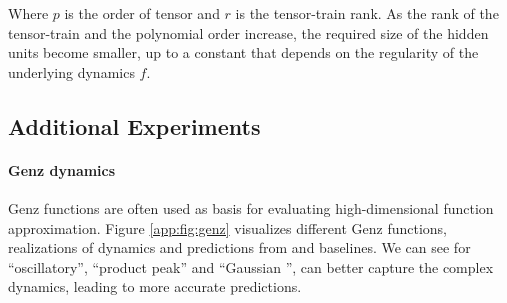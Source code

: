 Where $p$ is the order of tensor and $r$ is the tensor-train rank. As the rank of the tensor-train and the polynomial order increase, the required size of the hidden units become smaller, up to a constant that depends on the regularity of the underlying dynamics $f$.

\subsection{Additional Experiments}
\paragraph{Genz dynamics}
Genz functions  are often used as basis for evaluating high-dimensional function approximation.  Figure \ref{app:fig:genz} visualizes different Genz  functions, realizations of dynamics and predictions from \tlstm{} and baselines.  We can see for ``oscillatory'', ``product peak'' and ``Gaussian '', \tlstm{} can better capture the complex dynamics, leading to more accurate predictions.  



